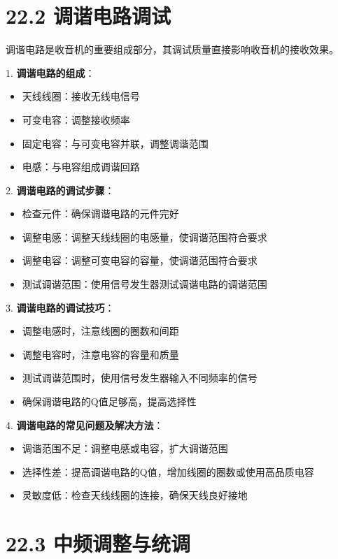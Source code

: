 \documentclass[12pt,UTF8]{ctexbook}
\begin{document}
\section*{22.2 调谐电路调试}

调谐电路是收音机的重要组成部分，其调试质量直接影响收音机的接收效果。

1. \textbf{调谐电路的组成}：
   \begin{itemize}[leftmargin=3.5em]
   \item 天线线圈：接收无线电信号
   \item 可变电容：调整接收频率
   \item 固定电容：与可变电容并联，调整调谐范围
   \item 电感：与电容组成调谐回路
   \end{itemize}

2. \textbf{调谐电路的调试步骤}：
   \begin{itemize}[leftmargin=3.5em]
   \item 检查元件：确保调谐电路的元件完好
   \item 调整电感：调整天线线圈的电感量，使调谐范围符合要求
   \item 调整电容：调整可变电容的容量，使调谐范围符合要求
   \item 测试调谐范围：使用信号发生器测试调谐电路的调谐范围
   \end{itemize}

3. \textbf{调谐电路的调试技巧}：
   \begin{itemize}[leftmargin=3.5em]
   \item 调整电感时，注意线圈的圈数和间距
   \item 调整电容时，注意电容的容量和质量
   \item 测试调谐范围时，使用信号发生器输入不同频率的信号
   \item 确保调谐电路的Q值足够高，提高选择性
   \end{itemize}

4. \textbf{调谐电路的常见问题及解决方法}：
   \begin{itemize}[leftmargin=3.5em]
   \item 调谐范围不足：调整电感或电容，扩大调谐范围
   \item 选择性差：提高调谐电路的Q值，增加线圈的圈数或使用高品质电容
   \item 灵敏度低：检查天线线圈的连接，确保天线良好接地
   \end{itemize}

\section*{22.3 中频调整与统调}
\end{document}
